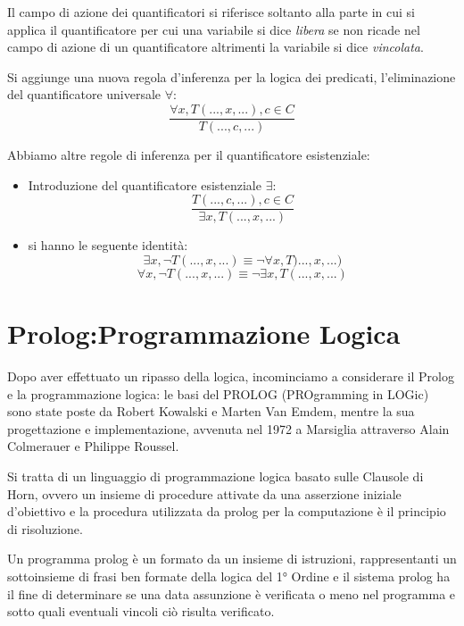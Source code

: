 \documentclass[a4paper]{report}
\begin{document}
Il campo di azione dei quantificatori si riferisce soltanto alla parte in cui
si applica il quantificatore per cui una variabile si dice \emph{libera}
se non ricade nel campo di azione di un quantificatore altrimenti la variabile si dice \emph{vincolata}.

Si aggiunge una nuova regola d'inferenza per la logica dei predicati, l'eliminazione del quantificatore universale $\forall$:
$$\frac{\forall x, T(...,x,...), c\in C}{T(...,c,...)}$$

Abbiamo altre regole di inferenza per il quantificatore esistenziale:
\begin{itemize}
\item Introduzione del quantificatore esistenziale $\exists$:
$$\frac{T(...,c,...), c\in C}{\exists x, T(...,x,...)}$$
\item si hanno le seguente identità:
$$\exists x, \neg T(...,x,...)\equiv \neg\forall x, T)...,x,...)$$
$$\forall x, \neg T(...,x,...)\equiv \neg\exists x, T(...,x,...)$$
\end{itemize}

\chapter{Prolog:Programmazione Logica}
Dopo aver effettuato un ripasso della logica, incominciamo a considerare il Prolog e la programmazione logica:
le basi del PROLOG (PROgramming in LOGic) sono state poste da Robert Kowalski e Marten Van Emdem, mentre la sua progettazione e implementazione,
avvenuta nel 1972 a Marsiglia attraverso Alain Colmerauer e Philippe Roussel.

Si tratta di un linguaggio di programmazione logica basato sulle Clausole di Horn, ovvero un insieme di procedure attivate
da una asserzione iniziale d’obiettivo e la procedura utilizzata da prolog per la computazione è il principio di risoluzione.

Un programma prolog è un formato da un insieme di istruzioni, rappresentanti un sottoinsieme di frasi ben formate della logica del 1° Ordine
e il sistema prolog ha il fine di determinare se una data assunzione è verificata o meno nel programma e sotto quali eventuali vincoli
ciò risulta  verificato.
\end{document}
